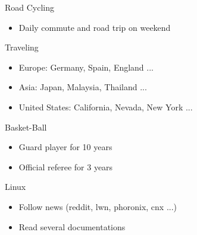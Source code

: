 \documentclass[letterpaper]{jm-cv} %
\begin{document}
\begin{multicols}{2}
  \small {

    {\color{mainblue}\faBicycle} Road Cycling
    {\footnotesize
      \vspace{-0.2cm}
      \begin{itemize}
      \item[\color{maingray}\faArrowRight] Daily commute and road trip on weekend
      \end{itemize}
    }

    {\color{mainblue}\faUser} Traveling
    {\footnotesize
      \vspace{-0.2cm}
      \begin{itemize}
      \item[\color{maingray}\faArrowRight] Europe: Germany, Spain, England ...
      \item[\color{maingray}\faArrowRight] Asia: Japan, Malaysia, Thailand ...
      \item[\color{maingray}\faArrowRight] United States: California, Nevada, New York ...
      \end{itemize}
    }

    {\color{mainblue}\faDribbble} Basket-Ball
    {\footnotesize
      \vspace{-0.2cm}
      \begin{itemize}
      \item[\color{maingray}\faArrowRight] Guard player for 10 years
      \item[\color{maingray}\faArrowRight] Official referee for 3 years
      \end{itemize}
    }

    {\color{mainblue}\faLinux} Linux
    {\footnotesize
      \vspace{-0.2cm}
      \begin{itemize}
      \item[\color{maingray}\faArrowRight] Follow news (reddit, lwn, phoronix, cnx ...)
      \item[\color{maingray}\faArrowRight] Read several documentations
      \end{itemize}
    }
  }

\end{multicols}
\end{document}
